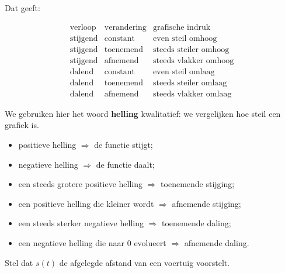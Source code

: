 \documentclass{ximera}
\begin{document}
Dat geeft:

\[
\begin{array}{c|c|c}
\text{verloop} & \text{verandering} & \text{grafische indruk}\\
\hline
\text{stijgend} & \text{constant} & \text{even steil omhoog}\\
\text{stijgend} & \text{toenemend} & \text{steeds steiler omhoog}\\
\text{stijgend} & \text{afnemend} & \text{steeds vlakker omhoog}\\
\text{dalend} & \text{constant} & \text{even steil omlaag}\\
\text{dalend} & \text{toenemend} & \text{steeds steiler omlaag}\\
\text{dalend} & \text{afnemend} & \text{steeds vlakker omlaag}
\end{array}
\]




We gebruiken hier het woord \textbf{helling} kwalitatief:
we vergelijken hoe steil een grafiek is.

\begin{itemize}
  \item positieve helling \(\Rightarrow\) de functie stijgt;
  \item negatieve helling \(\Rightarrow\) de functie daalt;
  \item een steeds grotere positieve helling \(\Rightarrow\) toenemende stijging;
  \item een positieve helling die kleiner wordt \(\Rightarrow\) afnemende stijging;
  \item een steeds sterker negatieve helling \(\Rightarrow\) toenemende daling;
  \item een negatieve helling die naar \(0\) evolueert \(\Rightarrow\) afnemende daling.
\end{itemize}







Stel dat \(s(t)\) de afgelegde afstand van een voertuig voorstelt.
\end{document}
